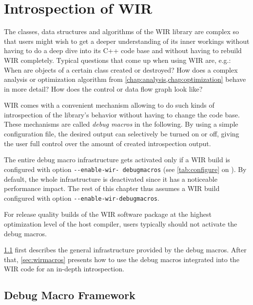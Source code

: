 \chapter{Introspection of WIR}
\label{chap:debug}
\renewcommand{\sectiontitle}{}

The classes, data structures and algorithms of the \gls{WIR} library are complex so that users might wish to get a deeper understanding of its inner workings without having to do a deep dive into its C++ code base and without having to rebuild \gls{WIR} completely.
Typical questions that come up when using \gls{WIR} are, e.g.: When are objects of a certain class created or destroyed? How does a complex analysis or optimization algorithm from \cref{chap:analysis,chap:optimization} behave in more detail? How does the control or data flow graph look like?

\gls{WIR} comes with a convenient mechanism allowing to do such kinds of introspection of the library's behavior without having to change the code base.
These mechanisms are called \emph{debug macros} in the following.
By using a simple configuration file, the desired output can selectively be turned on or off, giving the user full control over the amount of created introspection output.

The entire debug macro infrastructure gets activated only if a \gls{WIR} build is configured with option \texttt{-{}-enable-wir- debugmacros} (see \cref{tab:configure} on ).
By default, the whole infrastructure is deactivated since it has a noticeable performance impact.
The rest of this chapter thus assumes a \gls{WIR} build configured with option \texttt{-{}-enable-wir-debugmacros}.
\begin{wirNote}
For release quality builds of the \gls{WIR} software package at the highest optimization level of the host compiler, users typically should not activate the debug macros.
\end{wirNote}

\cref{sec:debugmacros} first describes the general infrastructure provided by the debug macros.
After that, \cref{sec:wirmacros} presents how to use the debug macros integrated into the \gls{WIR} code for an in-depth introspection.


\section{Debug Macro Framework}
\label{sec:debugmacros}

